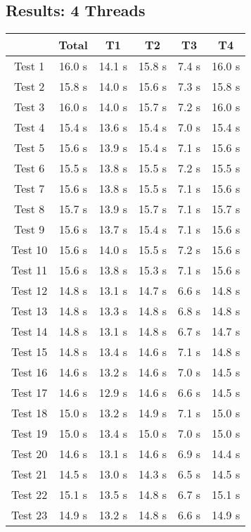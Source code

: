 \documentclass[12pt]{article}
\begin{document}
  

\subsection{Results: 4 Threads}
\begin{tabular}{ | c | c | c | c | c | c | }
  \hline	 & Total & T1 & T2 & T3 & T4 \\ \hline 
  Test 1& 16.0 s& 14.1 s& 15.8 s& 7.4 s& 16.0 s\\ \hline 
  Test 2& 15.8 s& 14.0 s& 15.6 s& 7.3 s& 15.8 s\\ \hline 
  Test 3& 16.0 s& 14.0 s& 15.7 s& 7.2 s& 16.0 s\\ \hline 
  Test 4& 15.4 s& 13.6 s& 15.4 s& 7.0 s& 15.4 s\\ \hline 
  Test 5& 15.6 s& 13.9 s& 15.4 s& 7.1 s& 15.6 s\\ \hline 
  Test 6& 15.5 s& 13.8 s& 15.5 s& 7.2 s& 15.5 s\\ \hline 
  Test 7& 15.6 s& 13.8 s& 15.5 s& 7.1 s& 15.6 s\\ \hline 
  Test 8& 15.7 s& 13.9 s& 15.7 s& 7.1 s& 15.7 s\\ \hline 
  Test 9& 15.6 s& 13.7 s& 15.4 s& 7.1 s& 15.6 s\\ \hline 
  Test 10& 15.6 s& 14.0 s& 15.5 s& 7.2 s& 15.6 s\\ \hline 
  Test 11& 15.6 s& 13.8 s& 15.3 s& 7.1 s& 15.6 s\\ \hline 
  Test 12& 14.8 s& 13.1 s& 14.7 s& 6.6 s& 14.8 s\\ \hline 
  Test 13& 14.8 s& 13.3 s& 14.8 s& 6.8 s& 14.8 s\\ \hline 
  Test 14& 14.8 s& 13.1 s& 14.8 s& 6.7 s& 14.7 s\\ \hline 
  Test 15& 14.8 s& 13.4 s& 14.6 s& 7.1 s& 14.8 s\\ \hline 
  Test 16& 14.6 s& 13.2 s& 14.6 s& 7.0 s& 14.5 s\\ \hline 
  Test 17& 14.6 s& 12.9 s& 14.6 s& 6.6 s& 14.5 s\\ \hline 
  Test 18& 15.0 s& 13.2 s& 14.9 s& 7.1 s& 15.0 s\\ \hline 
  Test 19& 15.0 s& 13.4 s& 15.0 s& 7.0 s& 15.0 s\\ \hline 
  Test 20& 14.6 s& 13.1 s& 14.6 s& 6.9 s& 14.4 s\\ \hline 
  Test 21& 14.5 s& 13.0 s& 14.3 s& 6.5 s& 14.5 s\\ \hline 
  Test 22& 15.1 s& 13.5 s& 14.8 s& 6.7 s& 15.1 s\\ \hline 
  Test 23& 14.9 s& 13.2 s& 14.8 s& 6.6 s& 14.9 s\\ \hline 

\end{tabular}
\end{document}
